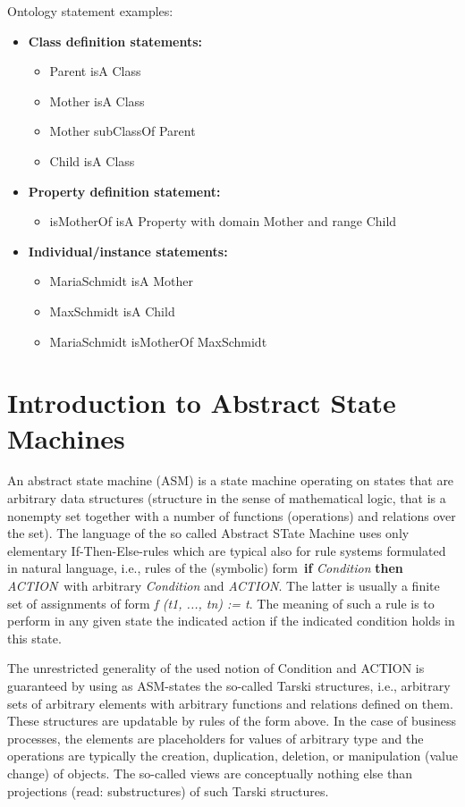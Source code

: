 Ontology statement examples:
\begin{itemize}
	\item \textbf {Class definition statements:}
	\begin{itemize}
		\item Parent isA Class
		\item Mother isA Class
		\item Mother subClassOf Parent
		\item Child isA Class
	\end{itemize}
	\item \textbf {Property definition statement:}
	\begin{itemize}
		\item isMotherOf isA Property with domain Mother and range Child
	\end{itemize}
	\item \textbf{Individual/instance statements:}
	\begin{itemize}
		\item MariaSchmidt isA Mother
		\item MaxSchmidt isA Child
		\item MariaSchmidt isMotherOf MaxSchmidt
	\end{itemize}
\end{itemize}


\section{Introduction to Abstract State Machines }

An abstract state machine (ASM) is a state machine operating on states that are arbitrary data structures (structure in the sense of mathematical logic, that is a nonempty set together with a number of functions (operations) and relations over the set).
The language of the so called Abstract STate Machine uses only elementary If-Then-Else-rules which are typical also for rule systems formulated in natural language, i.e., rules of the (symbolic) form\
\textbf{if} \textit{Condition} \textbf{then} \textit{ACTION}\
with arbitrary \textit{Condition} and \textit{ACTION}. The latter is usually a finite set of assignments of form \textit{f (t1, ..., tn) := t}. The meaning of such a rule is to perform in any given state the indicated action if the indicated condition holds in this state.\ 

The unrestricted generality of the used notion of Condition and ACTION is guaranteed by using as ASM-states the so-called Tarski structures, i.e., arbitrary sets of arbitrary elements with arbitrary functions and relations defined on them. These structures are updatable by rules of the form above. In the case of business processes, the elements are placeholders for values of arbitrary type and the operations are typically the creation, duplication, deletion, or manipulation (value change) of objects. The so-called views are conceptually nothing else than projections (read: substructures) of such Tarski structures.\

